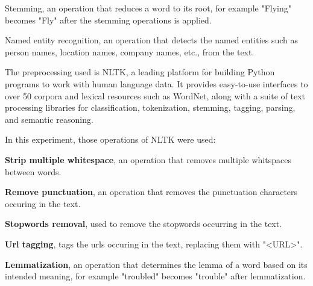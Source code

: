 \documentclass[12pt, a4paper]{article}
\begin{document}
Stemming, an operation that reduces a word to its root, for example "Flying" becomes "Fly" after the stemming operations is applied.


Named entity recognition, an operation that detects the named entities such as person names, location names, company names, etc., from the text.
\hfill\break



The preprocessing used is NLTK, a leading platform for building Python programs to work with human language data.
It provides easy-to-use interfaces to over 50 corpora and lexical resources such as WordNet,
along with a suite of text processing libraries for classification, tokenization, stemming, tagging, parsing,
and semantic reasoning.


\hfill\break
In this experiment, those operations of NLTK were used:

\textbf{Strip multiple whitespace}, an operation that removes multiple whitspaces between words.


\textbf{Remove punctuation}, an operation that removes the punctuation characters occuring in the text.


\textbf{Stopwords removal}, used to remove the stopwords occurring in the text.


\textbf{Url tagging}, tags the urls occuring in the text, replacing them with "<URL>".


\textbf{Lemmatization}, an operation that determines the lemma of a word based on its intended meaning, for example "troubled" becomes "trouble" after lemmatization.
\end{document}
